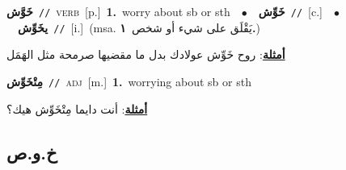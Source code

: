 \documentclass[10pt,a4paper,twoside]{article} %
\begin{document}
\begin{multicols}{2}
{\setlength\topsep{0pt}\textbf{\foreignlanguage{arabic}{خَوَّش}}\ {\color{gray}\texttt{//}\color{black}}\ \textsc{verb}\ [p.]\ \textbf{1.}~worry about sb or sth\ \ $\bullet$\ \ \setlength\topsep{0pt}\textbf{\foreignlanguage{arabic}{خَوِّش}}\ {\color{gray}\texttt{//}\color{black}}\ [c.]\ \ $\bullet$\ \ \setlength\topsep{0pt}\textbf{\foreignlanguage{arabic}{يخَوِّش}}\ {\color{gray}\texttt{//}\color{black}}\ [i.]\ \color{gray}(msa. \foreignlanguage{arabic}{يَقْلَق على شيء أو شخص}~\foreignlanguage{arabic}{\textbf{١.}})\color{black}\  \begin{flushright}\color{gray}\foreignlanguage{arabic}{\textbf{\underline{\foreignlanguage{arabic}{أمثلة}}}: روح خَوِّش عولادك بدل ما مقضيها صرمحة مثل الهَمَل}\end{flushright}\color{black}} \vspace{2mm}

{\setlength\topsep{0pt}\textbf{\foreignlanguage{arabic}{مِتْخَوِّش}}\ {\color{gray}\texttt{//}\color{black}}\ \textsc{adj}\ [m.]\ \textbf{1.}~worrying about sb or sth\  \begin{flushright}\color{gray}\foreignlanguage{arabic}{\textbf{\underline{\foreignlanguage{arabic}{أمثلة}}}: أنت دايما مِتْخَوِّش هيك؟}\end{flushright}\color{black}} \vspace{2mm}

\vspace{-3mm}
\subsection*{\color{blue}\foreignlanguage{arabic}{خ.و.ص}\color{blue}{}} 


\end{multicols}
\end{document}
